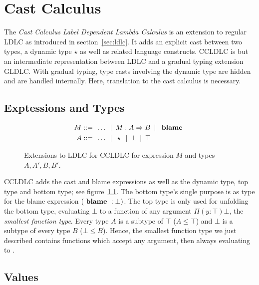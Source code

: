 \chapter{Cast Calculus}\label{chap:cast-calculus}

The \emph{Cast Calculus Label Dependent Lambda Calculus} is an extension to regular LDLC as introduced in section~\ref{sec:ldlc}. It adds an explicit cast between two types, a dynamic type $\star$ as well as related language constructs. CCLDLC is but an intermediate representation between LDLC and a gradual typing extension GLDLC. With gradual typing, type casts involving the dynamic type are hidden and are handled internally. Here, translation to the cast calculus is necessary.

\section{Exptessions and Types}\label{sec:cc-expressions}

\begin{figure}
\begin{align*}
 M ::= & \enspace \dots \enspace|\enspace
     M : A \Rightarrow B \enspace|\enspace \text{ \textbf{blame} } \\
 A ::= & \enspace \dots \enspace|\enspace
     \star \enspace|\enspace \bot \enspace|\enspace \top
\end{align*}
\caption[Extensions to LDLC for CCLDLC]{Extensions to LDLC for CCLDLC for expression $M$ and types $A, A', B, B'$.}
\label{fig:ccldlc-extensions}
\end{figure}

CCLDLC adds the cast and blame expressions as well as the dynamic type, top type and bottom type; see figure~\ref{fig:ccldlc-extensions}.
The bottom type's single purpose is as type for the blame expression $(\text{ \textbf{blame} } : \bot)$. The top type is only used for unfolding the bottom type, evaluating $\bot$ to a function of any argument $\Pi(y:\top)\bot$, the \emph{smallest function type}. Every type $A$ is a subtype of $\top$ ($A \leq \top$) and $\bot$ is a subtype of every type $B$ ($\bot \leq B$). Hence, the smallest function type we just described contains functions which accept any argument, then always evaluating to \blame.

\section{Values}

